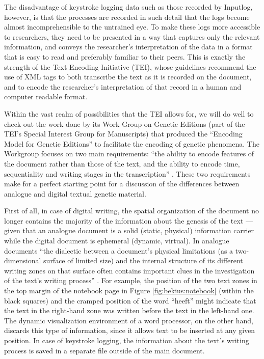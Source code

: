 \begin{paper}
The disadvantage of keystroke logging data such as those recorded by Inputlog, however,
is that the processes are recorded in such detail that the logs become almost incomprehensible 
to the untrained eye. To make these logs more accessible to researchers, they need to be
presented in a way that captures only the relevant information, and conveys the researcher's 
interpretation of the data in a format that is easy to read and preferably familiar to their peers.
This is exactly the strength of the Text Encoding Initiative (TEI), whose guidelines recommend the use of XML tags
to both transcribe the text as it is recorded on the document, and to encode the researcher's interpretation of that record 
in a human and computer readable format. 

Within the vast realm of possibilities that the TEI allows for, we will do well to check out the work done by its
Work Group on Genetic Editions (part of the TEI's Special Interest Group for Manuscripts) that
produced the ``Encoding Model for Genetic Editions'' \citeyearpar{workgroup_on_genetic_editions_encoding_2010}
to facilitate the encoding of genetic phenomena. The Workgroup focuses on two main requirements: ``the ability to
encode features of the document rather than those of the text, and the
ability to encode time, sequentiality and writing stages in the
transcription'' \citep[81]{dillen_digital_2015}. These two requirements make for a
perfect starting point for a discussion of the differences between
analogue and digital textual genetic material.

First of all, in case of digital writing, the spatial organization of the document no longer contains the majority of the information
about the genesis of the text --- given that an analogue document is a
solid (static, physical) information carrier while the digital document
is ephemeral (dynamic, virtual). In analogue documents ``the dialectic
between a document's physical limitations (as a two-dimensional surface
of limited size) and the internal structure of its different writing
zones on that surface often contains important clues in the
investigation of the text's writing process'' \citep[71]{dillen_digital_2015}. For
example, the position of the two text zones in the top margin of the
notebook page in Figure \ref{fig:bekius:notebook} (within the black squares) and the cramped
position of the word ``heeft'' might indicate that the text in the
right-hand zone was written before the text in the left-hand one. The
dynamic visualization environment of a word processor, on the other
hand, discards this type of information, since it allows text to be inserted at
any given position. In case of keystroke logging, the information about
the text's writing process is saved in a separate file outside of the
main document.


\end{paper}
